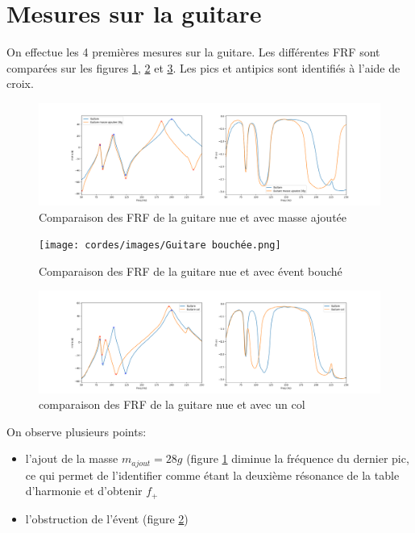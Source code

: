 \documentclass[atiam, article]{rapport} %
\begin{document}
\section{Mesures sur la guitare}
On effectue les 4 premières mesures sur la guitare. Les différentes FRF sont comparées sur les figures \ref{fig:frf-guitare-masse}, \ref{fig:frf-guitare-bouchee} et \ref{fig:frf-guitare-col}. Les pics et antipics sont identifiés à l'aide de croix.

\begin{figure}
    \centering
    \includegraphics[width=\textwidth]{cordes/images/Guitare masse ajoutee 28g.png}
    \caption{Comparaison des FRF de la guitare nue et avec masse ajoutée}
    \label{fig:frf-guitare-masse}
\end{figure}

\begin{figure}
    \centering
    \texttt{[image: cordes/images/Guitare bouchée.png]}
    \caption{Comparaison des FRF de la guitare nue et avec évent bouché}
    \label{fig:frf-guitare-bouchee}
\end{figure}

\begin{figure}
    \centering
    \includegraphics[width=\textwidth]{cordes/images/Guitare col.png}
    \caption{comparaison des FRF de la guitare nue et avec un col}
    \label{fig:frf-guitare-col}
\end{figure}

On observe plusieurs points:
\begin{itemize}
    \item l'ajout de la masse $m_{ajout} = 28 \si{g}$ (figure \ref{fig:frf-guitare-masse} diminue la fréquence du dernier pic, ce qui permet de l'identifier comme étant la deuxième résonance de la table d'harmonie et d'obtenir $f_+$
    \item l'obstruction de l'évent (figure \ref{fig:frf-guitare-bouchee})
\end{itemize}

\printbibliography
\end{document}
